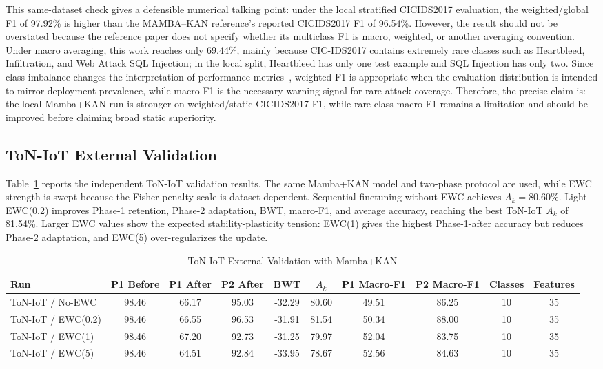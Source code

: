 \documentclass[a4paper,fleqn]{cas-dc}
\begin{document}
This same-dataset check gives a defensible numerical talking point: under the local stratified CICIDS2017 evaluation, the weighted/global F1 of 97.92\% is higher than the MAMBA--KAN reference's reported CICIDS2017 F1 of 96.54\%. However, the result should not be overstated because the reference paper does not specify whether its multiclass F1 is macro, weighted, or another averaging convention. Under macro averaging, this work reaches only 69.44\%, mainly because CIC-IDS2017 contains extremely rare classes such as Heartbleed, Infiltration, and Web Attack SQL Injection; in the local split, Heartbleed has only one test example and SQL Injection has only two. Since class imbalance changes the interpretation of performance metrics~\cite{luque2019imbalance}, weighted F1 is appropriate when the evaluation distribution is intended to mirror deployment prevalence, while macro-F1 is the necessary warning signal for rare attack coverage. Therefore, the precise claim is: the local Mamba+KAN run is stronger on weighted/static CICIDS2017 F1, while rare-class macro-F1 remains a limitation and should be improved before claiming broad static superiority.

\subsection{ToN-IoT External Validation}
Table~\ref{tab:toniot} reports the independent ToN-IoT validation results. The same Mamba+KAN model and two-phase protocol are used, while EWC strength is swept because the Fisher penalty scale is dataset dependent. Sequential finetuning without EWC achieves $A_k=80.60\%$. Light EWC(0.2) improves Phase-1 retention, Phase-2 adaptation, BWT, macro-F1, and average accuracy, reaching the best ToN-IoT $A_k$ of 81.54\%. Larger EWC values show the expected stability-plasticity tension: EWC(1) gives the highest Phase-1-after accuracy but reduces Phase-2 adaptation, and EWC(5) over-regularizes the update.

\begin{table}[htbp]
\caption{ToN-IoT External Validation with Mamba+KAN}
\label{tab:toniot}
\centering
\begin{tabular}{lccccccccc}
\toprule
Run & P1 Before & P1 After & P2 After & BWT & $A_k$ & P1 Macro-F1 & P2 Macro-F1 & Classes & Features \\
\midrule
ToN-IoT / No-EWC & 98.46 & 66.17 & 95.03 & -32.29 & 80.60 & 49.51 & 86.25 & 10 & 35 \\
ToN-IoT / EWC(0.2) & 98.46 & 66.55 & 96.53 & -31.91 & 81.54 & 50.34 & 88.00 & 10 & 35 \\
ToN-IoT / EWC(1) & 98.46 & 67.20 & 92.73 & -31.25 & 79.97 & 52.04 & 83.75 & 10 & 35 \\
ToN-IoT / EWC(5) & 98.46 & 64.51 & 92.84 & -33.95 & 78.67 & 52.56 & 84.63 & 10 & 35 \\
\bottomrule
\end{tabular}
\end{table}
\end{document}
